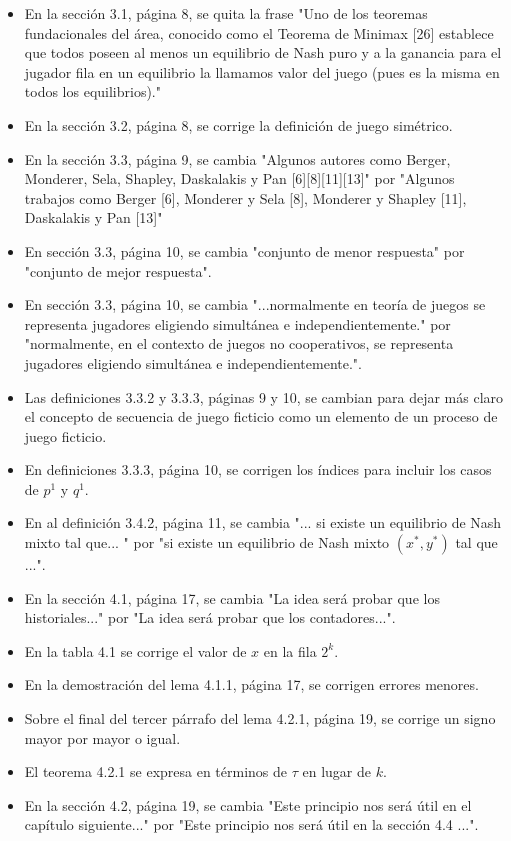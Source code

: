 \documentclass{article}
\begin{document}
\begin{itemize}
    \item En la sección 3.1, página 8, se quita la frase "Uno de los teoremas fundacionales del área, conocido como el Teorema de Minimax [26] establece que todos poseen al menos un equilibrio de Nash puro y a la ganancia para el jugador fila en un equilibrio la llamamos valor del juego (pues es la misma en todos los equilibrios)."
    \item En la sección 3.2, página 8, se corrige la definición de juego simétrico.
    \item En la sección 3.3, página 9, se cambia "Algunos autores como Berger, Monderer, Sela, Shapley, Daskalakis y Pan [6][8][11][13]" por "Algunos trabajos como Berger [6], Monderer y Sela [8], Monderer y Shapley [11], Daskalakis y Pan [13]"
    \item En sección 3.3, página 10, se cambia "conjunto de menor respuesta" por "conjunto de mejor respuesta".
    \item En sección 3.3, página 10, se cambia "...normalmente en teoría de juegos se representa jugadores eligiendo simultánea e independientemente." por "normalmente, en el contexto de juegos no cooperativos, se representa jugadores eligiendo simultánea e independientemente.".
    \item Las definiciones 3.3.2 y 3.3.3, páginas 9 y 10, se cambian para dejar más claro el concepto de secuencia de juego ficticio como un elemento de un proceso de juego ficticio.
    \item En definiciones 3.3.3, página 10, se corrigen los índices para incluir los casos de $p^1$ y $q^1$.
    \item En al definición 3.4.2, página 11, se cambia "... si existe un equilibrio de Nash mixto tal que... " por "si existe un equilibrio de Nash mixto $(x^*, y^*)$ tal que ...".
    \item En la sección 4.1, página 17, se cambia "La idea será probar que los historiales..." por "La idea será probar que los contadores...".
    \item En la tabla 4.1 se corrige el valor de $x$ en la fila $2^k$.
    \item En la demostración del lema 4.1.1, página 17, se corrigen errores menores.
    \item Sobre el final del tercer párrafo del lema 4.2.1, página 19, se corrige un signo mayor por mayor o igual.
    \item El teorema 4.2.1 se expresa en términos de $\tau$ en lugar de $k$.
    \item En la sección 4.2, página 19, se cambia "Este principio nos será útil en el capítulo siguiente..." por "Este principio nos será útil en la sección 4.4 ...".

\end{itemize}
\end{document}
